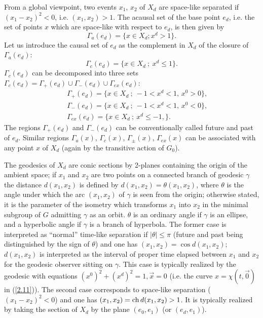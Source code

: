 \documentclass[a4paper,a4paper]{article}
\def\ch{{\rm ch\,}}
\begin{document}
\vskip 0.2cm
{}From a global viewpoint, two events  $x_1$, $x_2$ of $X_d$ are space-like
separated if $(x_1-x_2)^2<0$, i.e. $(x_1,x_2)>1$. The acausal set of the
base point $e_d$, i.e. the set of points $x$ which are space-like with respect
to $e_d$, is then given by
\begin{equation}
\Gamma_{a}(e_d) = \{x\in X_d; x^d >1 \}.
\end{equation}
Let us introduce the causal set of $e_d$ as the complement in $X_d$ of the
closure of $\Gamma_a(e_d)$:
\begin{equation}
\Gamma_c(e_d)= \{x\in X_d \ ; \ x^d\leq 1\}.
\end{equation}
$\Gamma_c (e_d)$ can be decomposed into three sets $\Gamma_c
(e_d)=\Gamma_+(e_d)\cup\Gamma_- (e_d) \cup\Gamma_{ex} (e_d)$:
\begin{eqnarray}
&&\Gamma_+ (e_d) = \{x\in X_d\ ;\ -1<x^d < 1,\, x^0 >0\},\nonumber\\
&&\Gamma_- (e_d) =  \{x\in X_d\ ;\ -1<x^d <1,\, x^0 <0\},\nonumber\\
&&\Gamma_{ex} (e_d) =  \{x\in X_d\ ; \ x^d \leq - 1,\}.
\end{eqnarray}
The regions $\Gamma_+ (e_d)$  and  $\Gamma_- (e_d)$ can be
conventionally called future and past of $e_d$.
Similar regions $\Gamma_a (x)$,
$\Gamma_c (x)$,
$\Gamma_{\pm} (x)$,
$\Gamma_{ex} (x)$ can be associated with any point $x$ of $X_d$
(again by the transitive action of $G_0$).


The geodesics of $X_d$ are conic sections by 2-planes containing the origin of
the ambient space; if $x_1$ and $x_2$ are two points on a connected branch of
geodesic $\gamma$ the distance $d(x_1,x_2)$ is defined by $d(x_1,x_2) =
\theta(x_1,x_2)$, where $\theta$ is the angle under which the arc $(x_1, x_2)$
of $\gamma$ is seen from the origin; otherwise stated, it is the parameter of
the isometry which transforms $x_1$ into $x_2$ in the minimal subgroup of $G$
admitting $\gamma$ as an orbit. $\theta$ is an ordinary angle if $\gamma$ is
an ellipse, and a hyperbolic angle if $\gamma$ is a branch of hyperbola. The
former case is interpreted as ``normal'' time-like separation if $|\theta| \le
\pi $ (future and past being distinguished by the sign of $\theta$) and one
has $(x_1,x_2) = \cos{d(x_1,x_2)}$; $d(x_1,x_2)$ is interpreted as the
interval of proper time elapsed between $x_1$ and $x_2$ for the geodesic
observer sitting on $\gamma$. This case is typically realized by the
geodesic with equations $(x^0)^2 + (x^d)^2 =1, \vec x =0$
(i.e. the curve $x= \chi(t,\vec 0)$ in (\ref{2.11})).
The second case corresponds to space-like
separation ($(x_1- x_2)^2 <0$) and one has
$(x_1,x_2) =  \ch {d(x_1,x_2)} > 1 $.
It is typically realized by taking
the section of $X_d$ by the plane $(e_0, e_1)$
(or $(e_d, e_1)$).
\end{document}
